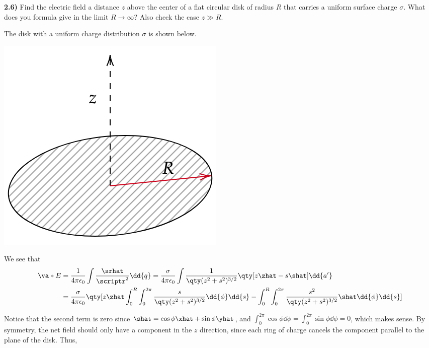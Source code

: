 \documentclass[12pt,a4paper]{article}
\newcommand{\prob}[2]{\textbf{#1)} #2}
\begin{document}
\prob{2.6}{Find the electric field a distance $z$ above the center of a flat circular disk of radius $R$ that carries a uniform surface charge $\sigma$. What does you formula give in the limit $R \rightarrow \infty$? Also check the case $z \gg R$.}

The disk with a uniform charge distribution $\sigma$ is shown below.

\bef
\includegraphics[scale=0.5]{./fig2.png}
\eef

We see that
\begin{align*}
\va*{E} &= \frac{1}{4\pi\epsilon_0}\int \frac{\srhat}{\scriptr^2} \dd{q} = \frac{\sigma}{4\pi\epsilon_0}\int \frac{1}{\qty(z^2 +s^2)^{3/2}}\qty[z\zhat - s\shat] \dd{a'} \\
&= \frac{\sigma}{4\pi\epsilon_0}\qty[z\zhat\int_{0}^{R}\int_{0}^{2\pi}\frac{s}{\qty(z^2 +s^2)^{3/2}} \dd{\phi}\dd{s} - \int_{0}^{R}\int_{0}^{2\pi}\frac{s^2}{\qty(z^2 +s^2)^{3/2}}\shat \dd{\phi}\dd{s}]
\end{align*}

Notice that the second term is zero since $\shat = \cos{\phi}\xhat + \sin{\phi}\yhat$, and $\int_{0}^{2\pi} \cos{\phi} \dd{\phi} = \int_{0}^{2\pi} \sin{\phi} \dd{\phi} = 0$, which makes sense.
By symmetry, the net field should only have a component in the $z$ direction, since each ring of charge cancels the component parallel to the plane of the disk.
Thus,
\end{document}

